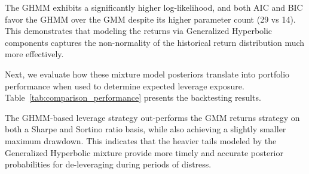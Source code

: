 \documentclass[11pt]{article}
\begin{document}

The GHMM exhibits a significantly higher log-likelihood, and both AIC and BIC favor the GHMM over the GMM despite its higher parameter count (29 vs 14). This demonstrates that modeling the returns via Generalized Hyperbolic components captures the non-normality of the historical return distribution much more effectively.

Next, we evaluate how these mixture model posteriors translate into portfolio performance when used to determine expected leverage exposure. Table~\ref{tab:comparison_performance} presents the backtesting results.


The GHMM-based leverage strategy out-performs the GMM returns strategy on both a Sharpe and Sortino ratio basis, while also achieving a slightly smaller maximum drawdown. This indicates that the heavier tails modeled by the Generalized Hyperbolic mixture provide more timely and accurate posterior probabilities for de-leveraging during periods of distress.
\end{document}

